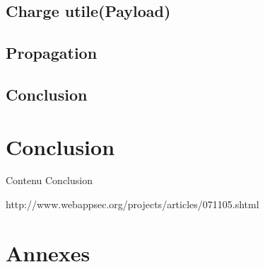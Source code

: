 \documentclass[a4paper,12pt]{report}
\begin{document}
    \newpage
    \section{Charge utile(Payload)}


    \newpage

    \section{Propagation}

    \newpage


    \section{Conclusion}

    \newpage

  \chapter*{Conclusion} %
    Contenu Conclusion

    \newpage

  \renewcommand\glossaryname{Glossaire}
  \printglossaries
  \newpage

  \nocite{*}
   http://www.webappsec.org/projects/articles/071105.shtml

  \newpage

  \listoffigures
  \newpage

  \chapter*{Annexes} %


  \tableofcontents
  \newpage
\end{document}
